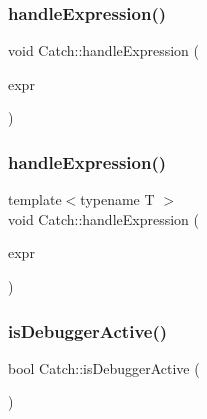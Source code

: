 \mbox{\label{namespaceCatch_a65af25091f2ab61056e166765963e525}} 
\subsubsection{\texorpdfstring{handle\+Expression()}{handleExpression()}\hspace{0.1cm}{\footnotesize\ttfamily [1/2]}}
{\footnotesize\ttfamily void Catch\+::handle\+Expression (\begin{DoxyParamCaption}\item[{\mbox{\hyperlink{structCatch_1_1ITransientExpression}{I\+Transient\+Expression}} const \&}]{expr }\end{DoxyParamCaption})}

\mbox{\label{namespaceCatch_af2c93db76668a981e75ae835699efce7}} 
\subsubsection{\texorpdfstring{handle\+Expression()}{handleExpression()}\hspace{0.1cm}{\footnotesize\ttfamily [2/2]}}
{\footnotesize\ttfamily template$<$typename T $>$ \\
void Catch\+::handle\+Expression (\begin{DoxyParamCaption}\item[{\mbox{\hyperlink{classCatch_1_1ExprLhs}{Expr\+Lhs}}$<$ T $>$ const \&}]{expr }\end{DoxyParamCaption})}

\mbox{\label{namespaceCatch_ab079497368fb1df25af39ad494d2a241}} 
\subsubsection{\texorpdfstring{is\+Debugger\+Active()}{isDebuggerActive()}}
{\footnotesize\ttfamily bool Catch\+::is\+Debugger\+Active (\begin{DoxyParamCaption}{ }\end{DoxyParamCaption})}

